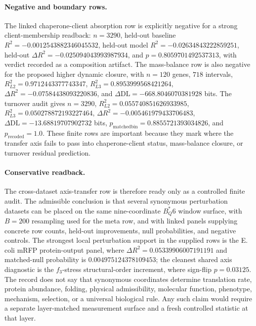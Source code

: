 \paragraph{Negative and boundary rows.}
The linked chaperone-client absorption row is explicitly negative for a strong client-membership readback: $n=3290$, held-out baseline $R^2=-0.0012543882346045532$, held-out model $R^2=-0.02634843222859251$, held-out $\Delta R^2=-0.025094043993987934$, and $p=0.8059701492537313$, with verdict recorded as a composition artifact.  The mass-balance row is also negative for the proposed higher dynamic closure, with $n=120$ genes, $718$ intervals, $R^2_{L2}=0.9712443377743347$, $R^2_{L3}=0.8953999568421264$, $\Delta R^2=-0.07584438093220836$, and $\Delta\mathrm{DL}=-668.8046070381928$ bits.  The turnover audit gives $n=3290$, $R^2_{L2}=0.055740851626933985$, $R^2_{L3}=0.050278872193227464$, $\Delta R^2=-0.005461979433706483$, $\Delta\mathrm{DL}=-13.68819707902732$ bits, $p_{\mathrm{matchedbin}}=0.8855721393034826$, and $p_{\mathrm{recoded}}=1.0$.  These finite rows are important because they mark where the transfer axis fails to pass into chaperone-client status, mass-balance closure, or turnover residual prediction.

\paragraph{Conservative readback.}
The cross-dataset axis-transfer row is therefore ready only as a controlled finite audit.  The admissible conclusion is that several synonymous perturbation datasets can be placed on the same nine-coordinate $B^*_Q6$ window surface, with $B=200$ resampling used for the meta row, and with linked panels supplying concrete row counts, held-out improvements, null probabilities, and negative controls.  The strongest local perturbation support in the supplied rows is the E. coli mRFP protein-output panel, where $\Delta R^2=0.05339906007191191$ and matched-null probability is $0.004975124378109453$; the cleanest shared axis diagnostic is the $f_3$-stress structural-order increment, where sign-flip $p=0.03125$.  The record does not say that synonymous coordinates determine translation rate, protein abundance, folding, physical admissibility, molecular function, phenotype, mechanism, selection, or a universal biological rule.  Any such claim would require a separate layer-matched measurement surface and a fresh controlled statistic at that layer.